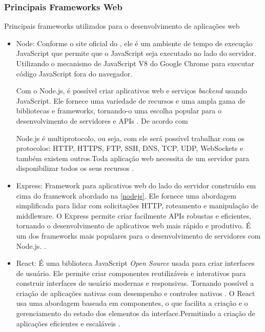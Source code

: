 \subsubsection{Principais Frameworks Web}
Principais frameworks utilizados para o desenvolvimento de aplicações web 
\begin{itemize}\label{nodejs}
    \item Node: Conforme o site oficial do \cite{Nodejs}, ele é um ambiente de tempo de execução JavaScript que permite que o JavaScript seja executado no lado do servidor. Utilizando o mecanismo de JavaScript V8 do Google Chrome para executar código JavaScript fora do navegador.
	
    Com o Node.js, é possível criar aplicativos web e serviços \textit{backend} usando JavaScript. Ele fornece uma variedade de recursos e uma ampla gama de bibliotecas e frameworks, tornando-o uma escolha popular para o desenvolvimento de servidores e APIs \cite{Nodejs}.
    De acordo com 
    \begin{citacao}
        Node.js é multiprotocolo, ou seja, com ele será possível trabalhar com os protocolos: HTTP, HTTPS, FTP, SSH, DNS, TCP, UDP, WebSockets e também existem outros.Toda aplicação web necessita de um servidor para disponibilizar todos os seus  recursos \cite{pereira2014aplicações}.
    \end{citacao}

    \item Express: Framework para aplicativos web do lado do servidor construído em cima do framework abordado na \autoref{nodejs}. 
     Ele fornece uma abordagem simplificada para lidar com solicitações HTTP, roteamento e manipulação de middleware. 
	 O Express permite criar facilmente APIs robustas e eficientes, tornando o desenvolvimento de aplicativos web mais rápido e produtivo. É um dos frameworks mais populares para o desenvolvimento de servidores com Node.js.
     \cite{pereira2014aplicações}.
    \item React: É uma biblioteca JavaScript \textit{Open Source} usada para criar interfaces de usuário. Ele permite criar componentes reutilizáveis e interativos para construir interfaces de usuário modernas e responsivas.  Tornando possível a criação de aplicações nativas com desempenho e controles nativos \cite{ReactMet54}.
    O React usa uma abordagem baseada em componentes, o que facilita a criação e o gerenciamento do estado dos elementos da interface.Permitindo a criação de aplicações eficientes e escaláveis \cite{ReactMet54}.
\end{itemize}

